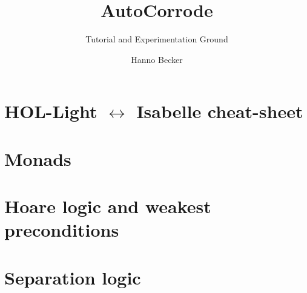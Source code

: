 \documentclass[9pt,aspectratio=169]{beamer}
\title{AutoCorrode}
\subtitle{Tutorial and Experimentation Ground}
\author{Hanno Becker}
\institute{Amazon Web Services}
\date{}
\begin{document}
\maketitle







\section{HOL-Light \texorpdfstring{$\leftrightarrow$}{<->} Isabelle cheat-sheet}


\section{Monads}


\section{Hoare logic and weakest preconditions}




\section{Separation logic}

\end{document}
